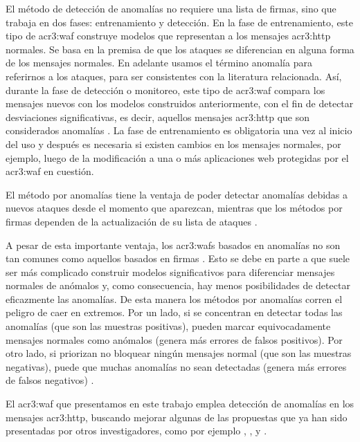 El método de detección de anomalías no requiere una lista de firmas,
sino que trabaja en dos fases: entrenamiento y detección. En la fase
de entrenamiento, este tipo de \gls{acr3:waf} construye modelos que
representan a los mensajes \gls{acr3:http} normales. Se basa en la premisa
de que los ataques se diferencian en alguna forma de los mensajes normales.
En adelante usamos el término anomalía para referirnos a los ataques,
para ser consistentes con la literatura relacionada.
Así, durante la fase de detección o monitoreo, este tipo de \gls{acr3:waf}
compara los mensajes nuevos con los modelos construidos anteriormente,
con el fin de detectar desviaciones significativas, es decir, aquellos
mensajes \gls{acr3:http} que son considerados anomalías
\citep{kruegel2003anomaly}. %
La fase de entrenamiento es obligatoria una vez al inicio del uso y
después es necesaria si existen cambios en los mensajes normales, por
ejemplo, luego de la modificación a una o más aplicaciones web protegidas
por el \gls{acr3:waf} en cuestión.

El método por anomalías tiene la ventaja de poder detectar anomalías
debidas a nuevos ataques desde el momento que aparezcan, mientras que
los métodos por firmas dependen de la actualización de su lista de ataques
\citep{kruegel2003anomaly}. %

A pesar de esta importante ventaja, los \gls{acr3:waf}s basados en anomalías
no son tan comunes como aquellos basados en firmas
\citep{sommer2010outside} %
\citep{kruegel2003anomaly}. %
Esto se debe en parte a que suele ser más complicado construir modelos
significativos para diferenciar mensajes normales de anómalos y, como
consecuencia, hay menos posibilidades de detectar eficazmente las anomalías.
De esta manera los métodos por anomalías corren el peligro de caer en
extremos. Por un lado, si se concentran en detectar todas las anomalías
(que son las muestras positivas), pueden marcar equivocadamente mensajes
normales como anómalos (genera más errores de falsos positivos).
Por otro lado, si priorizan no bloquear ningún mensajes normal (que son
las muestras negativas), puede que muchas anomalías no sean detectadas
(genera más errores de falsos negativos)
\citep{torranoGimenez2015study}. %

El \gls{acr3:waf} que presentamos en este trabajo emplea detección de
anomalías en los mensajes \gls{acr3:http}, buscando mejorar algunas de
las propuestas que ya han sido presentadas por otros investigadores,
como por ejemplo \citep{kruegel2003anomaly},
\citep{gimenez2015tfg}, \citep{gimenez2015paper} y
\citep{torranoGimenez2015study}.
\bigskip

